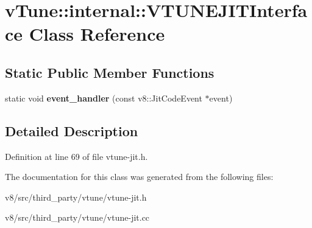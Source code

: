\hypertarget{classvTune_1_1internal_1_1VTUNEJITInterface}{}\section{v\+Tune\+:\+:internal\+:\+:V\+T\+U\+N\+E\+J\+I\+T\+Interface Class Reference}
\label{classvTune_1_1internal_1_1VTUNEJITInterface}
\subsection*{Static Public Member Functions}
\begin{DoxyCompactItemize}
\item 
\mbox{\label{classvTune_1_1internal_1_1VTUNEJITInterface_ae15fda77f51e4ffccd3e32b4baa2a045}} 
static void {\bfseries event\+\_\+handler} (const v8\+::\+Jit\+Code\+Event $\ast$event)
\end{DoxyCompactItemize}


\subsection{Detailed Description}


Definition at line 69 of file vtune-\/jit.\+h.



The documentation for this class was generated from the following files\+:\begin{DoxyCompactItemize}
\item 
v8/src/third\+\_\+party/vtune/vtune-\/jit.\+h\item 
v8/src/third\+\_\+party/vtune/vtune-\/jit.\+cc\end{DoxyCompactItemize}
